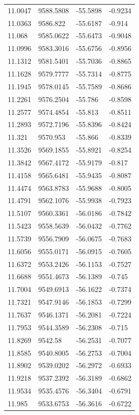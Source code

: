 \begin{table}[H]
\begin{tabular}{llll}
11.0047 & 9588.5808 & -55.5898 & -0.9234 \\
11.0363 & 9586.822 & -55.6187 & -0.914 \\
11.068 & 9585.0622 & -55.6473 & -0.9048 \\
11.0996 & 9583.3016 & -55.6756 & -0.8956 \\
11.1312 & 9581.5401 & -55.7036 & -0.8865 \\
11.1628 & 9579.7777 & -55.7314 & -0.8775 \\
11.1945 & 9578.0145 & -55.7589 & -0.8686 \\
11.2261 & 9576.2504 & -55.786 & -0.8598 \\
11.2577 & 9574.4854 & -55.813 & -0.8511 \\
11.2893 & 9572.7196 & -55.8396 & -0.8424 \\
11.321 & 9570.953 & -55.866 & -0.8339 \\
11.3526 & 9569.1855 & -55.8921 & -0.8254 \\
11.3842 & 9567.4172 & -55.9179 & -0.817 \\
11.4158 & 9565.6481 & -55.9435 & -0.8087 \\
11.4474 & 9563.8783 & -55.9688 & -0.8005 \\
11.4791 & 9562.1076 & -55.9938 & -0.7923 \\
11.5107 & 9560.3361 & -56.0186 & -0.7842 \\
11.5423 & 9558.5639 & -56.0432 & -0.7762 \\
11.5739 & 9556.7909 & -56.0675 & -0.7683 \\
11.6056 & 9555.0171 & -56.0915 & -0.7605 \\
11.6372 & 9553.2426 & -56.1153 & -0.7527 \\
11.6688 & 9551.4673 & -56.1389 & -0.745 \\
11.7004 & 9549.6913 & -56.1622 & -0.7374 \\
11.7321 & 9547.9146 & -56.1853 & -0.7299 \\
11.7637 & 9546.1371 & -56.2081 & -0.7224 \\
11.7953 & 9544.3589 & -56.2308 & -0.715 \\
11.8269 & 9542.58 & -56.2531 & -0.7077 \\
11.8585 & 9540.8005 & -56.2753 & -0.7004 \\
11.8902 & 9539.0202 & -56.2972 & -0.6933 \\
11.9218 & 9537.2392 & -56.3189 & -0.6862 \\
11.9534 & 9535.4576 & -56.3404 & -0.6791 \\
11.985 & 9533.6753 & -56.3616 & -0.6722 \\

\end{tabular}
\end{table}
